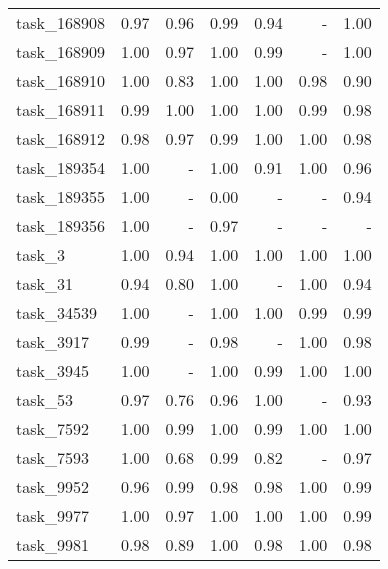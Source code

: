 \begin{tabular}{lrrrrrr}
 task\_168908 &       0.97 &      0.96 &          0.99 & 0.94 &     - &      1.00 \\
 task\_168909 &       1.00 &      0.97 &          1.00 & 0.99 &     - &      1.00 \\
 task\_168910 &       1.00 &      0.83 &          1.00 & 1.00 &  0.98 &      0.90 \\
 task\_168911 &       0.99 &      1.00 &          1.00 & 1.00 &  0.99 &      0.98 \\
 task\_168912 &       0.98 &      0.97 &          0.99 & 1.00 &  1.00 &      0.98 \\
 task\_189354 &       1.00 &         - &          1.00 & 0.91 &  1.00 &      0.96 \\
 task\_189355 &       1.00 &         - &          0.00 &    - &     - &      0.94 \\
 task\_189356 &       1.00 &         - &          0.97 &    - &     - &         - \\
      task\_3 &       1.00 &      0.94 &          1.00 & 1.00 &  1.00 &      1.00 \\
     task\_31 &       0.94 &      0.80 &          1.00 &    - &  1.00 &      0.94 \\
  task\_34539 &       1.00 &         - &          1.00 & 1.00 &  0.99 &      0.99 \\
   task\_3917 &       0.99 &         - &          0.98 &    - &  1.00 &      0.98 \\
   task\_3945 &       1.00 &         - &          1.00 & 0.99 &  1.00 &      1.00 \\
     task\_53 &       0.97 &      0.76 &          0.96 & 1.00 &     - &      0.93 \\
   task\_7592 &       1.00 &      0.99 &          1.00 & 0.99 &  1.00 &      1.00 \\
   task\_7593 &       1.00 &      0.68 &          0.99 & 0.82 &     - &      0.97 \\
   task\_9952 &       0.96 &      0.99 &          0.98 & 0.98 &  1.00 &      0.99 \\
   task\_9977 &       1.00 &      0.97 &          1.00 & 1.00 &  1.00 &      0.99 \\
   task\_9981 &       0.98 &      0.89 &          1.00 & 0.98 &  1.00 &      0.98 \\
\bottomrule
\end{tabular}
